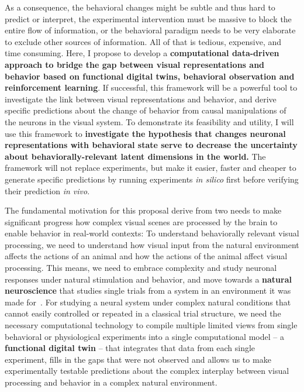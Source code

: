 \documentclass[COG,11pt]{ercgrant}
\begin{document}
As a consequence, the behavioral changes might be subtle and thus hard to predict or interpret, the experimental intervention must be massive to block the entire flow of information, or the behavioral paradigm needs to be very elaborate to exclude other sources of information. 
All of that is tedious, expensive, and time consuming. 
Here, I propose to develop a \textbf{computational data-driven approach to bridge the gap between visual representations and behavior based on functional digital twins, behavioral observation and reinforcement learning}. 
If successful, this framework will be a powerful tool to investigate the link between visual representations and behavior, and derive specific predictions about the change of behavior from causal manipulations of the neurons in the visual system.
To demonstrate its feasibility and utility, I will use this framework to \textbf{investigate the hypothesis that changes neuronal representations with behavioral state serve to decrease the uncertainty about behaviorally-relevant latent dimensions in the world.} 
The framework will not replace experiments, but make it easier, faster and cheaper to generate specific predictions by running experiments \textit{in silico} first before verifying their prediction \textit{in vivo}.

The fundamental motivation for this proposal derive from two needs to make significant progress how complex visual scenes are processed by the brain to enable behavior in real-world contexts:  To understand behaviorally relevant visual processing, we need to understand how visual input from the natural environment affects the actions of an animal and how the actions of the animal affect visual processing. This means, we need to embrace complexity and study neuronal responses under natural stimulation and behavior, and move towards a \textbf{natural neuroscience} that studies single trials from a system in an environment it was made for~\parencite{Huk2018-ez, Datta2019-qj}. 
 For studying a neural system under complex natural conditions that cannot easily controlled or repeated in a classical trial structure, we need the necessary computational technology to compile multiple limited views from single behavioral or physiological experiments into a single computational model -- a \textbf{functional digital twin} -- that integrates that data from each single experiment, fills in the gaps that were not observed and allows us to make experimentally testable predictions about the complex interplay between visual processing and behavior in a complex natural environment.
\end{document}
